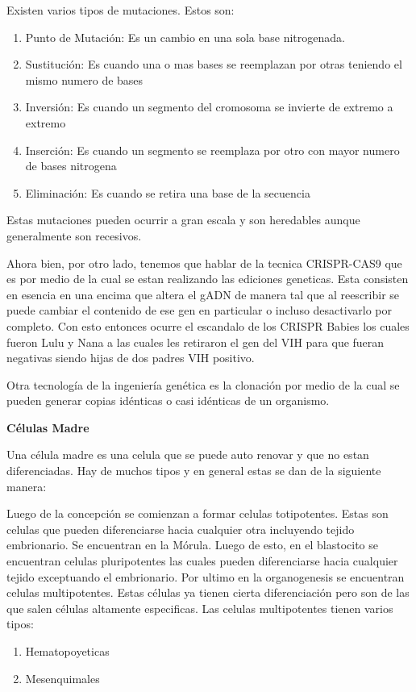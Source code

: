 \documentclass[12pt]{exam}
\begin{document}
Existen varios tipos de mutaciones. Estos son:
\begin{enumerate}
  \item Punto de Mutación: Es un cambio en una sola base nitrogenada.
  \item Sustitución: Es cuando una o mas bases se reemplazan por otras teniendo el mismo numero de bases
  \item Inversión: Es cuando un segmento del cromosoma se invierte de extremo a extremo
  \item Inserción: Es cuando un segmento se reemplaza por otro con mayor numero de bases nitrogena
  \item Eliminación: Es cuando se retira una base de la secuencia
\end{enumerate}

Estas mutaciones pueden ocurrir a gran escala y son heredables aunque generalmente son recesivos.

Ahora bien, por otro lado, tenemos que hablar de la tecnica CRISPR-CAS9 que es por medio de la cual se estan realizando las ediciones geneticas. Esta consisten en esencia en una encima que altera el gADN de manera tal que al reescribir se puede cambiar el contenido de ese gen en particular o incluso desactivarlo por completo. Con esto entonces ocurre el escandalo de los CRISPR Babies los cuales fueron Lulu y Nana a las cuales les retiraron el gen del VIH para que fueran negativas siendo hijas de dos padres VIH positivo.

Otra tecnología de la ingeniería genética es la clonación por medio de la cual se pueden generar copias idénticas o casi idénticas de un organismo.

\textbf{Células Madre}

Una célula madre es una celula que se puede auto renovar y que no estan diferenciadas. Hay de muchos tipos y en general estas se dan de la siguiente manera:

Luego de la concepción se comienzan a formar celulas totipotentes. Estas son celulas que pueden diferenciarse hacia cualquier otra incluyendo tejido embrionario. Se encuentran en la Mórula. Luego de esto, en el blastocito se encuentran celulas pluripotentes las cuales pueden diferenciarse hacia cualquier tejido exceptuando el embrionario. Por ultimo en la organogenesis se encuentran celulas multipotentes. Estas células ya tienen cierta diferenciación pero son de las que salen células altamente especificas. Las celulas multipotentes tienen varios tipos:

\begin{enumerate}
  \item Hematopoyeticas
  \item Mesenquimales
\end{enumerate}
\end{document}
